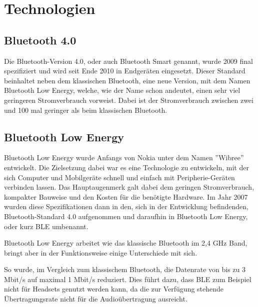 \chapter{Technologien}
\label{chap:technologies}

\section{Bluetooth 4.0}
\label{sec:technologies:bluetooth4}

Die Bluetooth-Version 4.0, oder auch Bluetooth Smart genannt, wurde 2009 final spezifiziert und wird seit Ende 2010 in Endgeräten eingesetzt.
Dieser Standard beinhaltet neben dem klassischen Bluetooth, eine neue Version, mit dem Namen Bluetooth Low Energy, welche, wie der Name schon andeutet, einen sehr viel geringeren Stromverbrauch vorweist. Dabei ist der Stromverbrauch zwischen zwei und 100 mal geringer als beim klassischen Bluetooth.


\section{Bluetooth Low Energy}
\label{sec:technologies:bluetoothLE}

Bluetooth Low Energy wurde Anfangs von Nokia unter dem Namen ''Wibree'' entwickelt. Die Zielsetzung dabei war es eine Technologie zu entwickeln, mit der sich Computer und Mobilgeräte schnell und einfach mit Peripherie-Geräten verbinden lassen. Das Hauptaugenmerk galt dabei dem geringen Stromverbrauch, kompakter Bauweise und den Kosten für die benötigte Hardware.
Im Jahr 2007 wurden diese Spezifikationen dann in den, sich in der Entwicklung befindenden, Bluetooth-Standard 4.0 aufgenommen und daraufhin in Bluetooth Low Energy, oder kurz BLE umbenannt.

Bluetooth Low Energy arbeitet wie das klassische Bluetooth im 2,4 GHz Band, bringt aber in der Funktionsweise einige Unterschiede mit sich.

So wurde, im Vergleich zum klassischem Bluetooth, die Datenrate von bis zu 3 Mbit/s auf maximal 1 Mbit/s reduziert. Dies führt dazu, dass BLE zum Beispiel nicht für Headsets genutzt werden kann, da die zur Verfügung stehende Übertragungsrate nicht für die Audioübertragung ausreicht.

